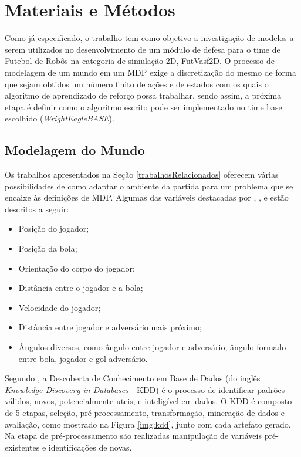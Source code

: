 \chapter{Materiais e Métodos} \label{sec:newModule} %

Como já especificado, o trabalho tem como objetivo a investigação de modelos a
serem utilizados no desenvolvimento de um módulo de defesa para o time de
Futebol de Robôs na categoria de simulação 2D, FutVasf2D. O processo de
modelagem de um mundo em um MDP exige a discretização do mesmo de forma que
sejam obtidos um número finito de ações e de estados com os quais o algoritmo de
aprendizado de reforço possa trabalhar, sendo assim, a próxima etapa é definir
como o algoritmo escrito pode ser implementado no time base escolhido
(\textit{WrightEagleBASE}).

\section{Modelagem do Mundo}\label{modelagem}

Os trabalhos apresentados na Seção \ref{trabalhosRelacionados} oferecem várias
possibilidades de como adaptar o ambiente da partida para um problema que se
encaixe às definições de MDP. Algumas das variáveis destacadas por
, ,
 e  estão descritos a
seguir:

\begin{itemize}
    \item Posição do jogador;
    \item Posição da bola;
    \item Orientação do corpo do jogador;
    \item Distância entre o jogador e a bola;
    \item Velocidade do jogador;
    \item Distância entre jogador e adversário mais próximo;
    \item Ângulos diversos, como ângulo entre jogador e adversário, ângulo
    formado entre bola, jogador e gol adversário.
\end{itemize}

Segundo , a Descoberta de Conhecimento
em Base de Dados (do inglês \textit{Knowledge Discovery in Databases} - KDD) é o
processo de identificar padrões válidos, novos, potencialmente uteis, e
inteligível em dados. O KDD é composto de 5 etapas, seleção, pré-processamento,
transformação, mineração de dados e avaliação, como mostrado na Figura
\ref{img:kdd}, junto com cada artefato gerado. Na etapa de pré-processamento são
realizadas manipulação de variáveis pré-existentes e identificações de novas.

